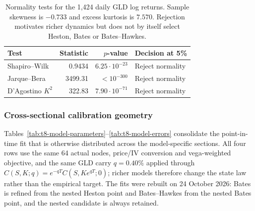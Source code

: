 \begin{table}[H]
\centering
\footnotesize
\begin{tabular}{@{}lrrl@{}}
\toprule
Test & Statistic & \(p\)-value & Decision at 5\% \\
\midrule
Shapiro--Wilk & 0.9434 & \(6.25\cdot10^{-23}\) & Reject normality \\
Jarque--Bera & 3499.31 & \(<10^{-300}\) & Reject normality \\
D'Agostino \(K^2\) & 322.83 & \(7.90\cdot10^{-71}\) & Reject normality \\
\bottomrule
\end{tabular}
\caption{Normality tests for the 1,424 daily GLD log returns. Sample skewness
is \(-0.733\) and excess kurtosis is \(7.570\). Rejection motivates richer
dynamics but does not by itself select Heston, Bates or Bates--Hawkes.}
\label{tab:t8-return-normality}
\end{table}

\subsubsection{Cross-sectional calibration geometry}

Tables~\ref{tab:t8-model-parameters}--\ref{tab:t8-model-errors} consolidate
the point-in-time fit that is otherwise distributed across the model-specific
sections. All four rows use the same 64 actual nodes, price/IV conversion and
vega-weighted objective, and the same GLD carry $q=0.40\%$ applied through
$C(S,K;q)=e^{-qT}C(S,Ke^{qT};0)$; richer models therefore change the state law
rather than the empirical target. The fits were rebuilt on 24 October 2026:
Bates is refined from the nested Heston point and Bates--Hawkes from the
nested Bates point, and the nested candidate is always retained.

